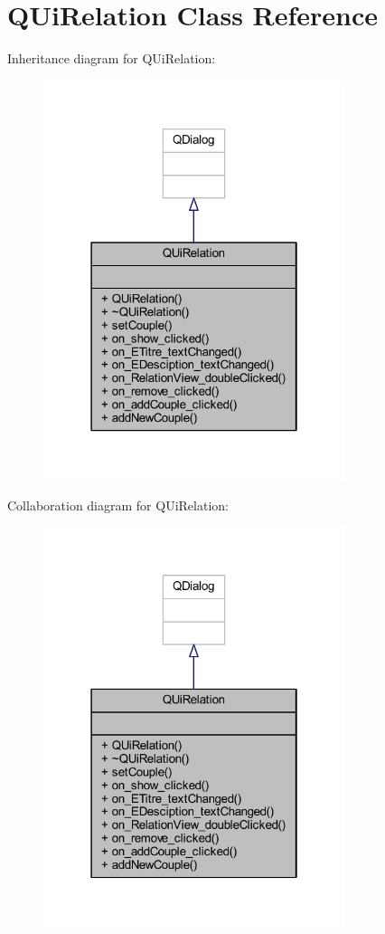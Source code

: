 \hypertarget{class_q_ui_relation}{}\section{Q\+Ui\+Relation Class Reference}
\label{class_q_ui_relation}


Inheritance diagram for Q\+Ui\+Relation\+:
\nopagebreak
\begin{figure}[H]
\begin{center}
\leavevmode
\includegraphics[width=250pt]{class_q_ui_relation__inherit__graph}
\end{center}
\end{figure}


Collaboration diagram for Q\+Ui\+Relation\+:
\nopagebreak
\begin{figure}[H]
\begin{center}
\leavevmode
\includegraphics[width=250pt]{class_q_ui_relation__coll__graph}
\end{center}
\end{figure}
